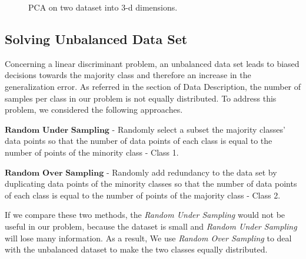 \documentclass{article} %
\begin{document}
\begin{figure}[h]
\center
{}
\hfill
{}
\caption{PCA on two dataset into 3-d dimensions.}
\end{figure}

\subsection{Solving Unbalanced Data Set}
Concerning a linear discriminant problem, an unbalanced data set leads to biased decisions towards the majority class and therefore an increase in the generalization error. As referred in the section of Data Description, the number of samples per class in our problem is not equally distributed. To address this problem, we considered the following approaches.


$\textbf{Random Under Sampling}$ - Randomly select a subset the majority classes' data points so that the number of data points of each class is equal to the number of points of the minority class - Class 1.

$\textbf{Random Over Sampling}$ - Randomly add redundancy to the data set by duplicating data points of the minority classes so that the number of data points of each class is equal to the number of points of the majority class - Class 2.

If we compare these two methods, the \emph{Random Under Sampling} would not be useful in our problem, because the dataset is small and \emph{Random Under Sampling} will lose many information. As a result, We use \emph{Random Over Sampling} to deal with the unbalanced dataset to make the two classes equally distributed.
\end{document}
